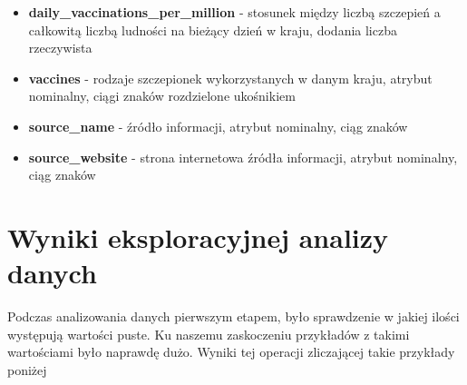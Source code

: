 \documentclass[12pt, oneside, openany]{article}
\begin{document}
\begin{itemize}
\item \textbf{daily\_vaccinations\_per\_million} - stosunek między liczbą szczepień a całkowitą liczbą ludności na bieżący dzień w kraju, dodania liczba rzeczywista
\item \textbf{vaccines} - rodzaje szczepionek wykorzystanych w danym kraju, atrybut nominalny, ciągi znaków rozdzielone ukośnikiem
\item \textbf{source\_name} - źródło informacji, atrybut nominalny, ciąg znaków
\item \textbf{source\_website} - strona internetowa źródła informacji, atrybut nominalny, ciąg znaków
\end{itemize}


\section{Wyniki eksploracyjnej analizy danych}



Podczas analizowania danych pierwszym etapem, było sprawdzenie w jakiej ilości występują wartości puste. Ku naszemu zaskoczeniu przykładów z takimi wartościami było naprawdę dużo. Wyniki tej operacji zliczającej takie przykłady poniżej 
\end{document}
